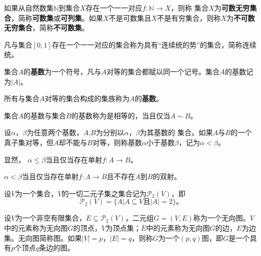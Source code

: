 \documentclass{beamer}
\begin{document}
\begin{CJK*}{UTF8}{gbsn}
\begin{frame}
    \begin{Def}
    如果从自然数集$\mathbb{N}$到集合$X$存在一个一一对应$f:\mathbb{N}\to X$，则称
    集合$X$为{\bfseries 可数无穷集合}，简称{\bfseries 可数集}或{\bfseries 可列集}。如果$X$不是可数集且$X$不是有穷集合，则称$X$为{\bfseries 不可数无穷集合}，简称{\bfseries 不可数集}。
  \end{Def}
\end{frame}
\begin{frame}
    \begin{Def}
    凡与集合$[0,1]$存在一个一一对应的集合称为具有“连续统的势”的集合，简称连续统。
  \end{Def}
\end{frame}
\begin{frame}
      \begin{Def}
    集合$A$的{\bfseries 基数}为一个符号，凡与$A$对等的集合都赋以同一个记号。集合$A$的基数记为$|A|$。
  \end{Def}
  \begin{Def}
    所有与集合$A$对等的集合构成的集族称为$A$的{\bfseries 基数}。
  \end{Def}
  \begin{Def}
    集合$A$的基数与集合$B$的基数称为是相等的，当且仅当$A \sim B$。
  \end{Def}
\end{frame}
\begin{frame}
    \begin{Def}
    设$\alpha$，$\beta$为任意两个基数，$A$,$B$为分别以$\alpha$，$\beta$为其基数的
    集合。如果$A$与$B$的一个真子集对等，但$A$却不能与$B$对等，则称基数$\alpha$小于基数$\beta$，记为$\alpha < \beta$。
  \end{Def}
  显然，
  $\alpha \leq \beta$当且仅当存在单射$f:A \to B$。

  $\alpha < \beta$当且仅当存在单射$f:A \to B$且不存在$A$到$B$的双射。
\end{frame}

\begin{frame}
  设$V$为一个集合，$V$的一切二元子集之集合记为$\mathcal{P}_2(V)$，即
\begin{equation*}
  \mathcal{P}_2(V) = \{A|A \subseteq V \text{且} |A| = 2\}\text{。}
\end{equation*}
\begin{Def}
  设$V$为一个非空有限集合，$E \subseteq \mathcal{P}_2(V)$，二元组$G = (V, E)$称为一个无向图。$V$中的元素称为无向图$G$的顶点，$V$为顶点集；$E$中的元素称为无向图$G$的边，$E$为边集。无向图简称图。如果$|V|=p$，$|E|=q$，则称$G$为一个$(p,q)$图，即$G$是一个具有$p$个顶点$q$条边的图。
\end{Def}
      \centering
\end{frame}
\end{CJK*}
\end{document}
